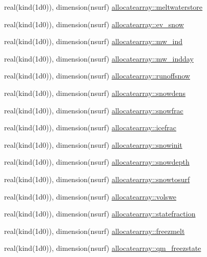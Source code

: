 \begin{DoxyCompactItemize}
real(kind(1d0)), dimension(nsurf) \hyperlink{namespaceallocatearray_acb39841a5a6d5dbe37a556535c505311}{allocatearray\+::meltwaterstore}
\item 
real(kind(1d0)), dimension(nsurf) \hyperlink{namespaceallocatearray_a6bf4d6d59ed380463ac60fb9d4f382b6}{allocatearray\+::ev\+\_\+snow}
\item 
real(kind(1d0)), dimension(nsurf) \hyperlink{namespaceallocatearray_aa072ff6c84e33695ad3f23bc7608a022}{allocatearray\+::mw\+\_\+ind}
\item 
real(kind(1d0)), dimension(nsurf) \hyperlink{namespaceallocatearray_a8352821f2496bf32d16cadfd727d69a2}{allocatearray\+::mw\+\_\+indday}
\item 
real(kind(1d0)), dimension(nsurf) \hyperlink{namespaceallocatearray_ad99e95bac5bad1e8fd7ae73daf74933e}{allocatearray\+::runoffsnow}
\item 
real(kind(1d0)), dimension(nsurf) \hyperlink{namespaceallocatearray_ac7b06ad52874f40a2c456863ffa3d262}{allocatearray\+::snowdens}
\item 
real(kind(1d0)), dimension(nsurf) \hyperlink{namespaceallocatearray_afddcfa297d34e2f62378a4de75940afb}{allocatearray\+::snowfrac}
\item 
real(kind(1d0)), dimension(nsurf) \hyperlink{namespaceallocatearray_af9cf09d85fc9f2037dbfffabb0a6dd8c}{allocatearray\+::icefrac}
\item 
real(kind(1d0)), dimension(nsurf) \hyperlink{namespaceallocatearray_af7e6a5b3ee785c8dda0fa0dc4c1ceb69}{allocatearray\+::snowinit}
\item 
real(kind(1d0)), dimension(nsurf) \hyperlink{namespaceallocatearray_a2aa940f81b7bfe5c4815dd2d15e5c734}{allocatearray\+::snowdepth}
\item 
real(kind(1d0)), dimension(nsurf) \hyperlink{namespaceallocatearray_aeddb481b8d76a9bd63fcc32506360636}{allocatearray\+::snowtosurf}
\item 
real(kind(1d0)), dimension(nsurf) \hyperlink{namespaceallocatearray_a69a92d219248dd5badf19a6cbcdfb372}{allocatearray\+::volswe}
\item 
real(kind(1d0)), dimension(nsurf) \hyperlink{namespaceallocatearray_a4ff0bd306cbe29d16f46ecdd19327b61}{allocatearray\+::statefraction}
\item 
real(kind(1d0)), dimension(nsurf) \hyperlink{namespaceallocatearray_a165ac402a66632f6391621809d9f4e06}{allocatearray\+::freezmelt}
\item 
real(kind(1d0)), dimension(nsurf) \hyperlink{namespaceallocatearray_a8a4eb23995f7afa0230b8afc6fefd81d}{allocatearray\+::qm\+\_\+freezstate}

\end{DoxyCompactItemize}
